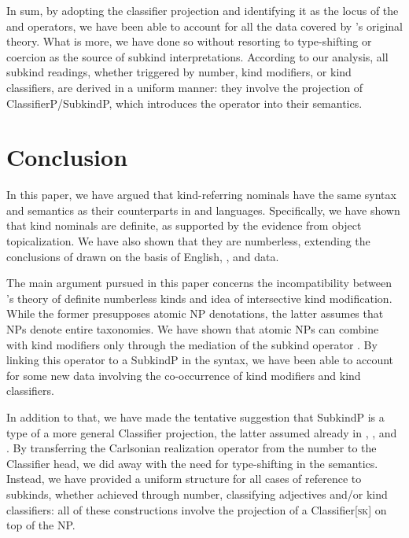 \documentclass[output=paper]{langscibook}
\begin{document}
In sum, by adopting the classifier projection and identifying it as the locus of the  and  operators, we have been able to account for all the data covered by \citeauthor{Borik.Espinal2012}'s original theory. What is more, we have done so without resorting to type-shifting or coercion as the source of subkind interpretations. According to our analysis, all subkind readings, whether triggered by number, kind modifiers, or kind classifiers, are derived in a uniform manner: they involve the projection of ClassifierP/SubkindP, which introduces the  operator into their semantics.


\section{Conclusion}\label{sec:5-conclusions}

In this paper, we have argued that  kind-referring nominals have the same syntax and semantics as their counterparts in  and  languages. Specifically, we have shown that  kind nominals are definite, as supported by the evidence from object topicalization. We have also shown that they are numberless, extending the conclusions of \citet{Borik.Espinal2012, Borik.Espinal2015} drawn on the basis of English, , and  data.

The main argument pursued in this paper concerns the incompatibility between \citeauthor{Borik.Espinal2012}'s theory of definite numberless kinds and  idea of intersective kind modification. While the former presupposes atomic NP denotations, the latter assumes that NPs denote entire taxonomies. We have shown that atomic NPs can combine with kind modifiers only through the mediation of the subkind operator . By linking this operator to a SubkindP in the syntax, we have been able to account for some new data involving the co-occurrence of kind modifiers and kind classifiers.

In addition to that, we have made the tentative suggestion that SubkindP is a type of a more general Classifier projection, the latter assumed already in \citet{Borer2005}, \citet{Picallo2006}, and \citet{Kratzer2007}. By transferring the Carlsonian realization operator  from the number to the Classifier head, we did away with the need for type-shifting in the semantics. Instead, we have provided a uniform structure for all cases of reference to subkinds, whether achieved through number, classifying adjectives and/or kind classifiers: all of these constructions involve the projection of a Classifier[\textsc{sk}] on top of the NP.
\end{document}
